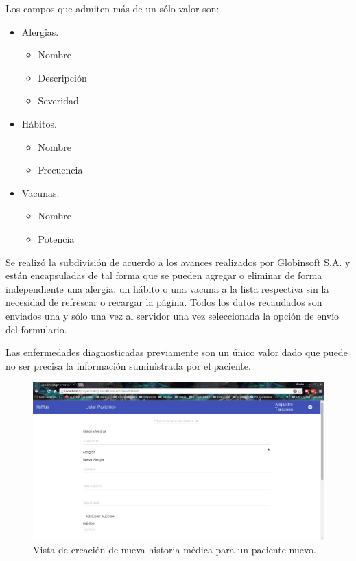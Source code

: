     Los campos que admiten más de un sólo valor son:
    \begin{itemize}
        \item Alergias.
            \begin{itemize}
                \item Nombre
                \item Descripción
                \item Severidad
            \end{itemize}
        \item Hábitos.
            \begin{itemize}
                \item Nombre
                \item Frecuencia
            \end{itemize}
        \item Vacunas.
            \begin{itemize}
                \item Nombre
                \item Potencia
            \end{itemize}
    \end{itemize}
    
    Se realizó la subdivisión de acuerdo a los avances realizados por Globinsoft S.A. y están encapsuladas de tal forma que se pueden agregar o eliminar de forma independiente una alergia, un hábito o una vacuna a la lista respectiva sin la necesidad de refrescar o recargar la página. Todos los datos recaudados son enviados una y sólo una vez al servidor una vez seleccionada la opción de envío del formulario.
    
    Las enfermedades diagnosticadas previamente son un único valor dado que puede no ser precisa la información suministrada por el paciente.
    
    \begin{figure}[htbp!]
        \begin{center}
            \includegraphics[width=.9\textwidth]{figures/p10}
        \end{center}
        \caption{Vista de creación de nueva historia médica para un paciente nuevo.}
        \label{creación}
    \end{figure}
    
